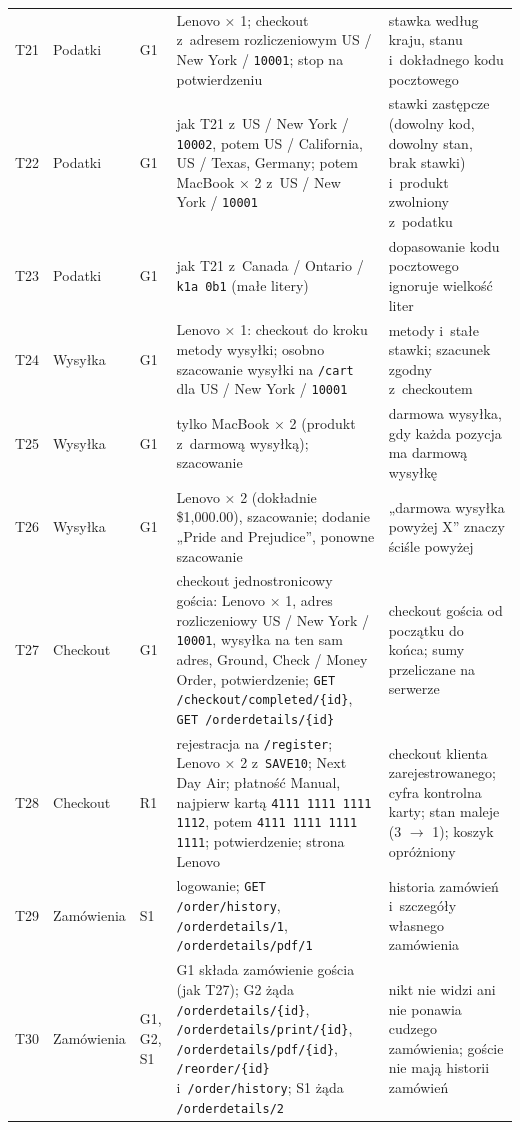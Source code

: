 {\begin{xltabular}{\linewidth}{@{}l >{\raggedright\arraybackslash}p{1.35cm} l >{\raggedright\arraybackslash}X >{\raggedright\arraybackslash}X@{}}
T21 & Podatki & G1 & Lenovo × 1; checkout z~adresem rozliczeniowym US / New York /
  \texttt{10001}; stop na potwierdzeniu & stawka według kraju, stanu i~dokładnego kodu
  pocztowego \\
T22 & Podatki & G1 & jak T21 z~US / New York / \texttt{10002}, potem US / California,
  US / Texas, Germany; potem MacBook × 2 z~US / New York / \texttt{10001} & stawki
  zastępcze (dowolny kod, dowolny stan, brak stawki) i~produkt zwolniony z~podatku \\
T23 & Podatki & G1 & jak T21 z~Canada / Ontario / \texttt{k1a 0b1} (małe litery) &
  dopasowanie kodu pocztowego ignoruje wielkość liter \\
T24 & Wysyłka & G1 & Lenovo × 1: checkout do kroku metody wysyłki; osobno szacowanie
  wysyłki na \texttt{/cart} dla US / New York / \texttt{10001} & metody i~stałe stawki;
  szacunek zgodny z~checkoutem \\
T25 & Wysyłka & G1 & tylko MacBook × 2 (produkt z~darmową wysyłką); szacowanie & darmowa
  wysyłka, gdy każda pozycja ma darmową wysyłkę \\
T26 & Wysyłka & G1 & Lenovo × 2 (dokładnie \$1,000.00), szacowanie; dodanie „Pride and
  Prejudice”, ponowne szacowanie & „darmowa wysyłka powyżej X” znaczy ściśle powyżej \\
T27 & Checkout & G1 & checkout jednostronicowy gościa: Lenovo × 1, adres rozliczeniowy
  US / New York / \texttt{10001}, wysyłka na ten sam adres, Ground, Check / Money Order,
  potwierdzenie; \texttt{GET /checkout/completed/\{id\}}, \texttt{GET /orderdetails/\{id\}}
  & checkout gościa od początku do końca; sumy przeliczane na serwerze \\
T28 & Checkout & R1 & rejestracja na \texttt{/register}; Lenovo × 2 z~\texttt{SAVE10};
  Next Day Air; płatność Manual, najpierw kartą \texttt{4111 1111 1111 1112}, potem
  \texttt{4111 1111 1111 1111}; potwierdzenie; strona Lenovo & checkout klienta
  zarejestrowanego; cyfra kontrolna karty; stan maleje (3 $\rightarrow$ 1); koszyk
  opróżniony \\
T29 & Zamówie\-nia & S1 & logowanie; \texttt{GET /order/history},
  \texttt{/orderdetails/1}, \texttt{/orderdetails/pdf/1} & historia zamówień i~szczegóły
  własnego zamówienia \\
T30 & Zamówie\-nia & G1, G2, S1 & G1 składa zamówienie gościa (jak T27); G2 żąda
  \texttt{/orderdetails/\{id\}}, \texttt{/orderdetails/print/\{id\}},
  \texttt{/orderdetails/pdf/\{id\}}, \texttt{/reorder/\{id\}} i~\texttt{/order/history};
  S1 żąda \texttt{/orderdetails/2} & nikt nie widzi ani nie ponawia cudzego zamówienia;
  goście nie mają historii zamówień \\
\end{xltabular}
}

